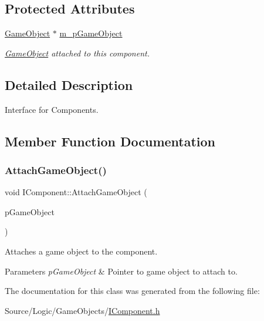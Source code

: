 \subsection*{Protected Attributes}
\begin{DoxyCompactItemize}
\item 
\mbox{\label{class_i_component_a2a03e5373f9b633031ed22597ab051ce}} 
\mbox{\hyperlink{class_game_object}{Game\+Object}} $\ast$ \mbox{\hyperlink{class_i_component_a2a03e5373f9b633031ed22597ab051ce}{m\+\_\+p\+Game\+Object}}
\begin{DoxyCompactList}\small\item\em \mbox{\hyperlink{class_game_object}{Game\+Object}} attached to this component. \end{DoxyCompactList}\end{DoxyCompactItemize}


\subsection{Detailed Description}
Interface for Components. 

\subsection{Member Function Documentation}
\mbox{\label{class_i_component_a4bd5209b8e63446a7fa7d8bf52512590}} 
\subsubsection{\texorpdfstring{Attach\+Game\+Object()}{AttachGameObject()}}
{\footnotesize\ttfamily void I\+Component\+::\+Attach\+Game\+Object (\begin{DoxyParamCaption}\item[{\mbox{\hyperlink{class_game_object}{Game\+Object}} $\ast$}]{p\+Game\+Object }\end{DoxyParamCaption})\hspace{0.3cm}{\ttfamily [inline]}}



Attaches a game object to the component. 


\begin{DoxyParams}{Parameters}
{\em p\+Game\+Object} & Pointer to game object to attach to. \\
\hline
\end{DoxyParams}


The documentation for this class was generated from the following file\+:\begin{DoxyCompactItemize}
\item 
Source/\+Logic/\+Game\+Objects/\mbox{\hyperlink{_i_component_8h}{I\+Component.\+h}}\end{DoxyCompactItemize}

